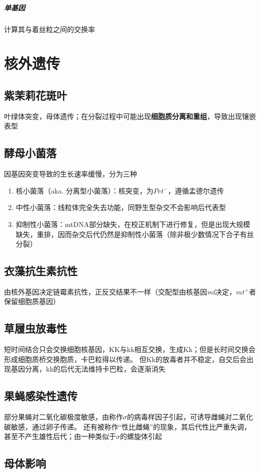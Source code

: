 \documentclass[a4paper, 12pt]{report}
\begin{document}
\paragraph{单基因}
计算其与着丝粒之间的交换率
\chapter{核外遗传}
\section{紫茉莉花斑叶}
叶绿体突变，母体遗传；在分裂过程中可能出现\textbf{细胞质分离和重组}，导致出现镶嵌表型
\section{酵母小菌落}
因基因突变导致的生长速率缓慢，分为三种
\begin{enumerate}
    \item 核小菌落（aka. 分离型小菌落）：核突变，为\(Pet^-\)，遵循孟德尔遗传
    \item 中性小菌落：线粒体完全失去功能，同野生型杂交不会影响后代表型
    \item 抑制性小菌落：mtDNA部分缺失，在校正机制下进行修复，但是出现大规模缺失，重排，因而杂交后代仍然是抑制性小菌落（除非极少数情况下合子有丝分裂）
\end{enumerate}
\section{衣藻抗生素抗性}
由核外基因决定链霉素抗性，正反交结果不一样（交配型由核基因\textit{mt}决定，\(mt^+\)者保留细胞质基因）
\section{草履虫放毒性}
短时间结合只会交换细胞核基因，KK与kk相互交换，生成Kk；但是长时间交换会形成细胞质桥交换胞质，卡巴粒得以传递。
但Kk的放毒者并不稳定，自交后会出现基因分离，kk的后代无法维持卡巴粒，会逐渐消失
\section{果蝇感染性遗传}
部分果蝇对二氧化碳极度敏感，由称作\(\sigma\)的病毒样因子引起，可诱导雌蝇对二氧化碳敏感，通过卵子传递。
还有被称作“性比雌蝇”的现象，其后代性比严重失调，甚至不产生雄性后代；由一种类似于\(\sigma\)的螺旋体引起
\section{母体影响}
\end{document}

